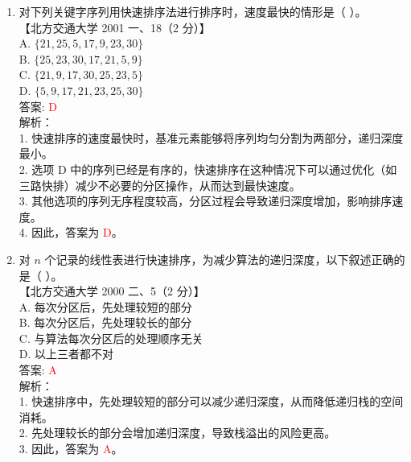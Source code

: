 \documentclass[lang=cn,newtx,10pt,scheme=chinese]{../../../elegantbook}
\begin{document}
\begin{enumerate}
    \item 对下列关键字序列用快速排序法进行排序时，速度最快的情形是（ ）。\\
    【北方交通大学 2001 一、18（2 分）】\\  

    A. $\{21, 25, 5, 17, 9, 23, 30\}$ \\  

    B. $\{25, 23, 30, 17, 21, 5, 9\}$ \\  

    C. $\{21, 9, 17, 30, 25, 23, 5\}$ \\  
    
    D. $\{5, 9, 17, 21, 23, 25, 30\}$ \\  

    答案: \textcolor{red}{D} \\

    解析：\\
    1. 快速排序的速度最快时，基准元素能够将序列均匀分割为两部分，递归深度最小。\\
    2. 选项 D 中的序列已经是有序的，快速排序在这种情况下可以通过优化（如三路快排）减少不必要的分区操作，从而达到最快速度。\\
    3. 其他选项的序列无序程度较高，分区过程会导致递归深度增加，影响排序速度。\\
    4. 因此，答案为 \textcolor{red}{D}。\\

    \item 对 $n$ 个记录的线性表进行快速排序，为减少算法的递归深度，以下叙述正确的是（ ）。\\
    【北方交通大学 2000 二、5（2 分）】\\  

    A. 每次分区后，先处理较短的部分 \\  
    B. 每次分区后，先处理较长的部分 \\  
    C. 与算法每次分区后的处理顺序无关 \\  
    D. 以上三者都不对 \\  

    答案: \textcolor{red}{A} \\

    解析：\\
    1. 快速排序中，先处理较短的部分可以减少递归深度，从而降低递归栈的空间消耗。\\
    2. 先处理较长的部分会增加递归深度，导致栈溢出的风险更高。\\
    3. 因此，答案为 \textcolor{red}{A}。\\


\end{enumerate}
\end{document}

